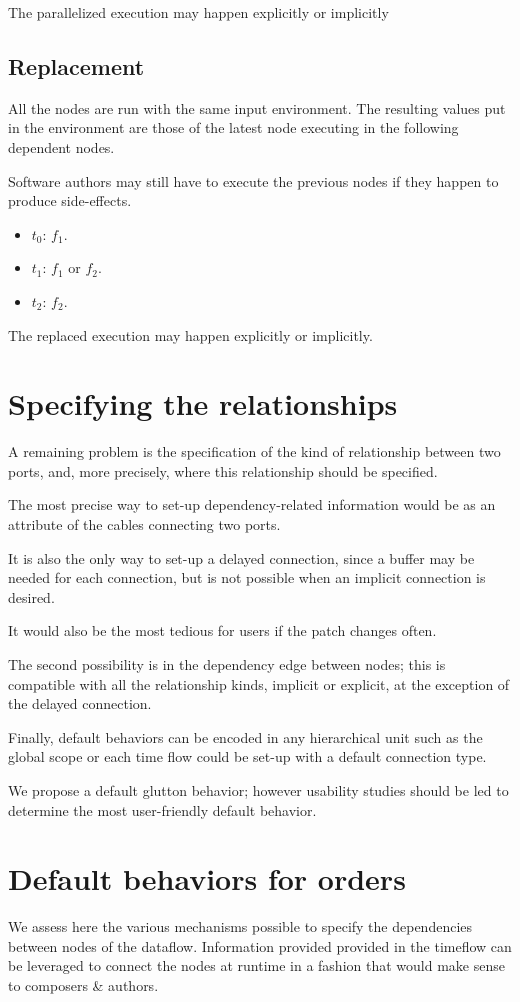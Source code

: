 \documentclass{article}
\begin{document}
The parallelized execution may happen explicitly or implicitly 

\subsection{Replacement}
All the nodes are run with the same input environment. 
The resulting values put in the environment are those of the latest node executing in the following dependent nodes.
    
Software authors may still have to execute the previous nodes if they happen to produce side-effects.
    
\begin{itemize}
  \item $t_0$: $f_1$.
  \item $t_1$: $f_1$ or $f_2$.
  \item $t_2$: $f_2$. 
\end{itemize}

The replaced execution may happen explicitly or implicitly.
    
\section{Specifying the relationships}
A remaining problem is the specification of the kind of relationship between two ports, and, more precisely, 
where this relationship should be specified.

The most precise way to set-up dependency-related information would be as an attribute of 
the cables connecting two ports. 

It is also the only way to set-up a delayed connection, since a buffer may be needed for each connection, but is not possible when an implicit connection is desired.

It would also be the most tedious for users if the patch changes often.

The second possibility is in the dependency edge between nodes; this is compatible with all the relationship kinds, implicit or explicit, at the exception of the delayed connection.

Finally, default behaviors can be encoded in any hierarchical unit such as the global scope or each time flow could be set-up with a default connection type.

We propose a default glutton behavior; however usability studies should be led to determine the most user-friendly default behavior.


\section{Default behaviors for orders}
\label{sec.order}
We assess here the various mechanisms possible to specify the dependencies between nodes of the dataflow.
Information provided provided in the timeflow can be leveraged to connect the nodes at runtime in a fashion 
that would make sense to composers \& authors.
    
\end{document}
